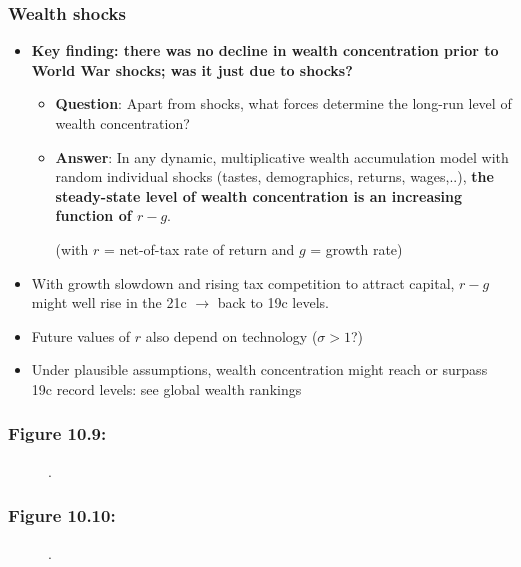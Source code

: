 \documentclass[t]{beamer}\usepackage[]{graphicx}\usepackage[]{color}
\begin{document}
\begin{frame}[label=WealthShocks]
\frametitle{Wealth shocks}
\begin{itemize}
\item
\textbf{Key finding: there was no decline in wealth concentration prior to World War shocks; was it just due to shocks?}
\begin{itemize}
\item
\textbf{Question}: Apart from shocks, what forces determine the long-run level of wealth concentration?
\item
\textbf{Answer}: In any dynamic, multiplicative wealth accumulation model with random individual shocks (tastes, demographics, returns, wages,..), 
\textbf{the steady-state level of wealth concentration is an increasing function of $r-g$}. 
\smallskip\par (with $r$ = net-of-tax rate of return and $g$ = growth rate)
\end{itemize}
\item
With growth slowdown and rising tax competition to attract capital, $r-g$ might well rise in the 21c $\rightarrow$ back to 19c levels.
\item
Future values of $r$ also depend on technology ($\sigma > 1$?)
\item 
Under plausible assumptions, wealth concentration might reach or surpass 19c record levels: see global wealth rankings
\end{itemize}
\end{frame}


\begin{frame}[label=Figure_10_9]
\frametitle{Figure 10.9: }
\begin{figure}[t]
\begin{minipage}[b]{\textwidth}
\centering

\caption{.}
\end{minipage}
\end{figure}
\end{frame}


\begin{frame}[label=Figure_10_10]
\frametitle{Figure 10.10: }
\begin{figure}[t]
\begin{minipage}[b]{\textwidth}
\centering

\caption{.}
\end{minipage}
\end{figure}
\end{frame}
\end{document}
